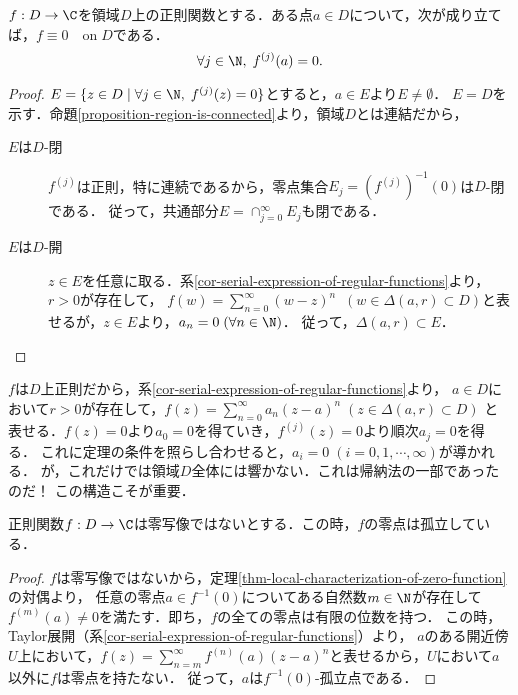 \documentclass[uplatex, dvipdfmx]{jsreport}
\begin{document}
\begin{theorem}[零関数の局所的な特徴付け]\label{thm-local-characterization-of-zero-function}
    $f:D\to\C$を領域$D$上の正則関数とする．ある点$a\in D$について，次が成り立てば，$f\equiv 0\quad\mathrm{on}\;D$である．
    \[\forall j\in\N,\;f^{(j)}(a)=0.\]
\end{theorem}
\begin{proof}
    $E=\{z\in D\mid \forall j\in\N,\; f^{(j)}(z)=0\}$とすると，$a\in E$より$E\ne\emptyset$．
    $E=D$を示す．命題\ref{proposition-region-is-connected}より，領域$D$とは連結だから，
    \begin{description}
        \item[$E$は$D$-閉]
        $f^{(j)}$は正則，特に連続であるから，零点集合$E_j=(f^{(j)})^{-1}(0)$は$D$-閉である．
        従って，共通部分$E=\cap_{j=0}^\infty E_j$も閉である．
        \item[$E$は$D$-開]
        $z\in E$を任意に取る．系\ref{cor-serial-expression-of-regular-functions}より，$r>0$が存在して，
        $f(w)=\sum^\infty_{n=0}(w-z)^n\;\;(w\in\Delta(a,r)\subset D)$と表せるが，$z\in E$より，$a_n=0\;(\forall n\in\N)$．
        従って，$\Delta(a,r)\subset E$．
    \end{description}
\end{proof}
\begin{remarks}[美しすぎる]
    $f$は$D$上正則だから，系\ref{cor-serial-expression-of-regular-functions}より，
    $a\in D$において$r>0$が存在して，$f(z)=\sum^\infty_{n=0}a_n(z-a)^n\;(z\in\Delta(a,r)\subset D)$
    と表せる．$f(z)=0$より$a_0=0$を得ていき，$f^{(j)}(z)=0$より順次$a_j=0$を得る．
    これに定理の条件を照らし合わせると，$a_i=0\;(i=0,1,\cdots,\infty)$が導かれる．
    が，これだけでは領域$D$全体には響かない．これは帰納法の一部であったのだ！
    この構造こそが重要．
\end{remarks}

\begin{theorem}[零点の孤立]\label{thm-zeros-are-isolated}
    正則関数$f:D\to\C$は零写像ではないとする．この時，$f$の零点は孤立している．
\end{theorem}
\begin{proof}
    $f$は零写像ではないから，定理\ref{thm-local-characterization-of-zero-function}の対偶より，
    任意の零点$a\in f^{-1}(0)$についてある自然数$m\in\N$が存在して$f^{(m)}(a)\ne 0$を満たす．即ち，$f$の全ての零点は有限の位数を持つ．
    この時，Taylor展開（系\ref{cor-serial-expression-of-regular-functions}）より，
    $a$のある開近傍$U$上において，$f(z)=\sum^{\infty}_{n=m}f^{(n)}(a)(z-a)^n$と表せるから，$U$において$a$以外に$f$は零点を持たない．
    従って，$a$は$f^{-1}(0)$-孤立点である．
\end{proof}
\end{document}
